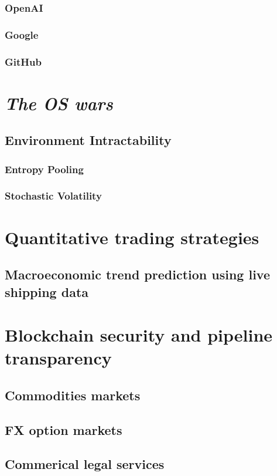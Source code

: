 \documentclass[11pt]{article}
\begin{document}
\subsubsection{OpenAI}
\subsubsection{Google}
\subsubsection{GitHub}
\section{\textit{The OS wars}}
\subsection{Environment Intractability}
\subsubsection{Entropy Pooling~\cite{vorobets_2024_portfolio}}
\subsubsection{Stochastic Volatility~\cite{heston_1993_a}}
\section{Quantitative trading strategies}
\subsection{Macroeconomic trend prediction using live shipping data}
\section{Blockchain security and pipeline transparency}
\subsection{Commodities markets}
\subsection{FX option markets}
\subsection{Commerical legal services}
\end{document}

